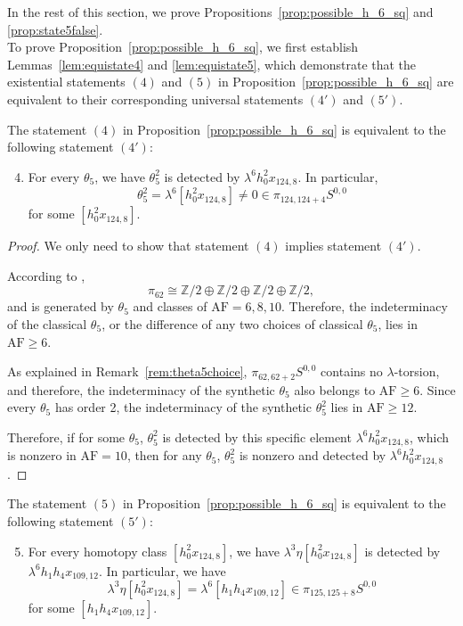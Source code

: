 \documentclass{amsart}
\numberwithin{equation}{section}
\newcommand{\AF}{\mathrm{AF}}
\begin{document}
In the rest of this section, we prove Propositions~\ref{prop:possible_h_6_sq} and \ref{prop:state5false}.\\

To prove Proposition~\ref{prop:possible_h_6_sq}, we first establish Lemmas~\ref{lem:equistate4} and \ref{lem:equistate5}, which demonstrate that the existential statements $(4)$ and $(5)$ in Proposition~\ref{prop:possible_h_6_sq} are equivalent to their corresponding universal statements $(4')$ and $(5')$. 

%
\begin{lemma} \label{lem:equistate4}
    The statement $(4)$ in Proposition~\ref{prop:possible_h_6_sq} is equivalent to the following statement $(4')$:
    \begin{enumerate}[label=(\arabic*')]\setcounter{enumi}{3} 
    \item For every $\theta_5$, we have $\theta_5^2$ is detected by $\lambda^6 h_0^2x_{124,8}$. In particular, 
    $$\theta_5^2 = \lambda^6 [h_0^2x_{124,8}] \neq 0 \in \pi_{124,124+4}S^{0,0}$$
    for some $[h_0^2x_{124,8}]$.
    \end{enumerate}
\end{lemma}

\begin{proof}
    We only need to show that statement $(4)$ implies statement $(4')$. 
    
    According to \cite{IWX}, 
    $$\pi_{62} \cong \mathbb{Z}/2 \oplus \mathbb{Z}/2 \oplus \mathbb{Z}/2 \oplus \mathbb{Z}/2,$$ 
    and is generated by $\theta_5$ and classes of $\AF=6,8,10$. Therefore, the indeterminacy of the classical $\theta_5$, or the difference of any two choices of classical $\theta_5$, lies in $\AF \ge 6$.
    
    As explained in Remark~\ref{rem:theta5choice}, $\pi_{62,62+2}S^{0,0}$ contains no $\lambda$-torsion, and therefore, the indeterminacy of the synthetic $\theta_5$ also belongs to $\AF \ge 6$. Since every $\theta_5$ has order 2, the indeterminacy of the synthetic $\theta_5^2$ lies in $\AF \ge 12$.

    Therefore, if for some $\theta_5$, $\theta_5^2$ is detected by this specific element $\lambda^6 h_0^2x_{124,8}$, which is nonzero in $\AF=10$, then for any $\theta_5$, $\theta_5^2$ is nonzero and detected by $\lambda^6 h_0^2x_{124,8}$.

\end{proof}


\begin{lemma} \label{lem:equistate5}
    The statement $(5)$ in Proposition~\ref{prop:possible_h_6_sq} is equivalent to the following statement $(5')$:
    \begin{enumerate}[label=(\arabic*')]\setcounter{enumi}{4} 
    \item For every homotopy class $[h_0^2x_{124,8}]$, we have
    $\lambda^3 \eta [h_0^2x_{124,8}]$ is detected by $\lambda^6 h_1h_4x_{109,12}$. In particular, we have 
    $$\lambda^3 \eta [h_0^2x_{124,8}] = \lambda^6 [h_1h_4x_{109,12}] \in \pi_{125,125+8} S^{0,0}$$
    for some $[h_1h_4x_{109,12}]$.
    \end{enumerate}
\end{lemma}
\end{document}
